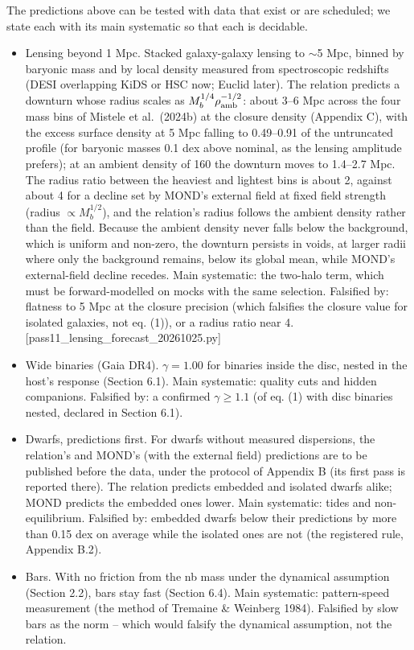\documentclass[
  10pt,
]{article}
\begin{document}
The predictions above can be tested with data that exist or are scheduled; we state each with its main systematic so that each is decidable.
\begin{itemize}
\item[(i)] Lensing beyond 1 Mpc. Stacked galaxy-galaxy lensing to $\sim$5 Mpc, binned by baryonic mass and by local density measured from spectroscopic redshifts (DESI overlapping KiDS or HSC now; Euclid later). The relation predicts a downturn whose radius scales as $M_b^{1/4}\rho_{\rm amb}^{-1/2}$: about 3--6 Mpc across the four mass bins of Mistele et al.~(2024b) at the closure density (Appendix C), with the excess surface density at 5 Mpc falling to 0.49--0.91 of the untruncated profile (for baryonic masses 0.1 dex above nominal, as the lensing amplitude prefers); at an ambient density of 160 the downturn moves to 1.4--2.7 Mpc. The radius ratio between the heaviest and lightest bins is about 2, against about 4 for a decline set by MOND's external field at fixed field strength (radius $\propto M_b^{1/2}$), and the relation's radius follows the ambient density rather than the field. Because the ambient density never falls below the background, which is uniform and non-zero, the downturn persists in voids, at larger radii where only the background remains, below its global mean, while MOND's external-field decline recedes. Main systematic: the two-halo term, which must be forward-modelled on mocks with the same selection. Falsified by: flatness to 5 Mpc at the closure precision (which falsifies the closure value for isolated galaxies, not eq. (1)), or a radius ratio near 4. {[}pass11\_lensing\_forecast\_20261025.py{]}
\item[(ii)] Wide binaries (Gaia DR4). $\gamma=1.00$ for binaries inside the disc, nested in the host's response (Section 6.1). Main systematic: quality cuts and hidden companions. Falsified by: a confirmed $\gamma\ge1.1$ (of eq. (1) with disc binaries nested, declared in Section 6.1).
\item[(iii)] Dwarfs, predictions first. For dwarfs without measured dispersions, the relation's and MOND's (with the external field) predictions are to be published before the data, under the protocol of Appendix B (its first pass is reported there). The relation predicts embedded and isolated dwarfs alike; MOND predicts the embedded ones lower. Main systematic: tides and non-equilibrium. Falsified by: embedded dwarfs below their predictions by more than 0.15 dex on average while the isolated ones are not (the registered rule, Appendix B.2).
\item[(iv)] Bars. With no friction from the nb mass under the dynamical assumption (Section 2.2), bars stay fast (Section 6.4). Main systematic: pattern-speed measurement (the method of Tremaine \& Weinberg 1984). Falsified by slow bars as the norm -- which would falsify the dynamical assumption, not the relation.
\end{itemize}
\end{document}
